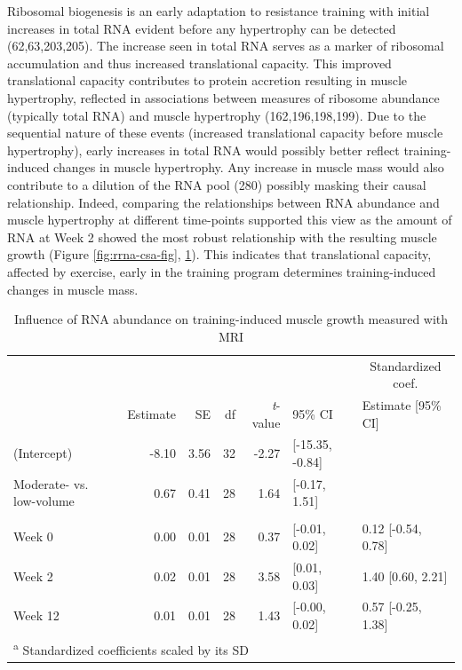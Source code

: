 \documentclass[twoside,10pt]{gihclass} %
\begin{document}
Ribosomal biogenesis is an early adaptation to resistance training with initial increases in total RNA evident before any hypertrophy can be detected
(62,63,203,205).
The increase seen in total RNA serves as a marker of ribosomal accumulation and thus increased translational capacity. This improved translational capacity contributes to protein accretion resulting in muscle hypertrophy, reflected in associations between measures of ribosome abundance (typically total RNA) and muscle hypertrophy
(162,196,198,199).
Due to the sequential nature of these events (increased translational capacity before muscle hypertrophy), early increases in total RNA would possibly better reflect training-induced changes in muscle hypertrophy.
Any increase in muscle mass would also contribute to a dilution of the RNA pool
(280)
possibly masking their causal relationship.
Indeed, comparing the relationships between RNA abundance and muscle hypertrophy at different time-points supported this view as the amount of RNA at Week 2 showed the most robust relationship with the resulting muscle growth (Figure \ref{fig:rrna-csa-fig}, \ref{tab:rna-csa-tab}). This indicates that translational capacity, affected by exercise, early in the training program determines training-induced changes in muscle mass.
\begin{table}

\caption{\label{tab:rna-csa-tab}Influence of RNA abundance on training-induced muscle growth measured with MRI}
\centering
\fontsize{7}{9}\selectfont
\begin{tabular}[t]{lrrrrll}
\toprule
\multicolumn{6}{c}{ } & \multicolumn{1}{c}{Standardized coef.} \\
\cmidrule(l{3pt}r{3pt}){7-7}
 & Estimate & SE & df & \textit{t}-value & 95\% CI & Estimate [95\% CI]\\
\midrule
(Intercept) & -8.10 & 3.56 & 32 & -2.27 & {}[-15.35, -0.84] & \\
Moderate- vs. low-volume & 0.67 & 0.41 & 28 & 1.64 & {}[-0.17, 1.51] & \\
\addlinespace[0.3em]
\multicolumn{7}{l}{\textbf{RNA abundance (ng mg\textsuperscript{-1})}}\\
\hspace{1em}Week 0 & 0.00 & 0.01 & 28 & 0.37 & {}[-0.01, 0.02] & 0.12 [-0.54, 0.78]\\
\hspace{1em}Week 2 & 0.02 & 0.01 & 28 & 3.58 & {}[0.01, 0.03] & 1.40 [0.60, 2.21]\\
\hspace{1em}Week 12 & 0.01 & 0.01 & 28 & 1.43 & {}[-0.00, 0.02] & 0.57 [-0.25, 1.38]\\
\bottomrule
\multicolumn{7}{l}{\textsuperscript{a} Standardized coefficients scaled by its SD}\\
\end{tabular}
\end{table}
\end{document}
